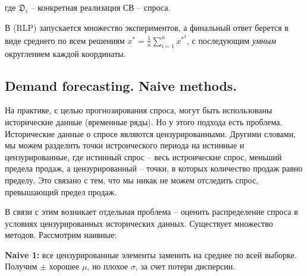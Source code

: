 \documentclass[reqno]{article}
\theoremstyle{definition}
\theoremstyle{definition}
\theoremstyle{definition}
\theoremstyle{definition}
\theoremstyle{definition}
\theoremstyle{definition}
\theoremstyle{definition}
\theoremstyle{definition}
\theoremstyle{definition}
\begin{document}
		где $\mathfrak{D}_i$ -- конкретная реализация СВ -- спроса.
		
		В (RLP) запускается множество экспериментов, а финальный ответ берется в виде среднего по всем решениям $x^* = \frac{1}{n}\sum\limits^n_{i = 1} {x^*}^i$, с последующим \textit{умным} округлением каждой координаты.
		
		
		\subsection{Demand forecasting. Naive methods.}
		
		На практике, с целью прогнозирования спроса, могут быть использованы исторические данные (временные ряды). Но у этого подхода есть проблема. Исторические данные о спросе являются цензурированными. Другими словами, мы можем разделить точки истроического периода на истинные и цензурированные, где истинный спрос -- весь истроические спрос, меньший предела продаж, а цензурированный -- точки, в которых количество продаж равно пределу. Это связано с тем, что мы никак не можем отследить спрос, превышающий предел продаж.
		
		В связи с этим возникает отдельная проблема -- оценить распределение спроса в условиях цензурированных исторических данных. Существует множество методов. Рассмотрим наивные:
		
		\textbf{Naive 1:} все цензурированные элементы заменить на среднее по всей выборке. Получим $\pm$ хорошее $\mu$, но плохое $\sigma$, за счет потери дисперсии.
		
		
		
		
\end{document}

